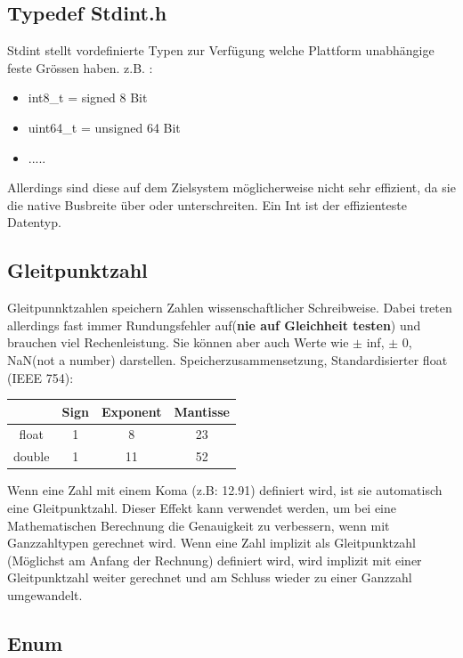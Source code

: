 \subsection{Typedef Stdint.h}

Stdint stellt vordefinierte Typen zur Verfügung welche Plattform unabhängige feste Grössen haben. z.B. :
\begin{itemize}[itemsep=1pt, parsep=0pt]
    \item int8\_t = signed 8 Bit
    \item uint64\_t = unsigned 64 Bit
    \item .....
\end{itemize}
Allerdings sind diese auf dem Zielsystem möglicherweise nicht sehr effizient, da sie die native Busbreite über oder unterschreiten. Ein Int ist der effizienteste Datentyp.

\subsection{Gleitpunktzahl}

Gleitpunnktzahlen speichern Zahlen wissenschaftlicher Schreibweise. Dabei treten allerdings fast immer Rundungsfehler auf(\textbf{nie auf Gleichheit testen}) und brauchen viel Rechenleistung. Sie können aber auch Werte wie $\pm$ inf, $\pm$ 0, NaN(not a number) darstellen.\newline
Speicherzusammensetzung, Standardisierter float (IEEE 754): 
\begin{center}
    \begin{tabular}{|c|c|c|c|} \hline  
          & Sign  & Exponent & Mantisse \\ \hline  
        float & 1 & 8 & 23\\ \hline  
        double & 1 & 11 & 52 \\ \hline   
    \end{tabular}
\end{center}

Wenn eine Zahl mit einem Koma (z.B: 12.91) definiert wird, ist sie automatisch eine Gleitpunktzahl. Dieser Effekt kann verwendet werden, um bei eine Mathematischen Berechnung die Genauigkeit zu verbessern, wenn mit Ganzzahltypen gerechnet wird. Wenn eine Zahl implizit als Gleitpunktzahl (Möglichst am Anfang der Rechnung) definiert wird, wird implizit mit einer Gleitpunktzahl weiter gerechnet und am Schluss wieder zu einer Ganzzahl umgewandelt.

\subsection{Enum}

